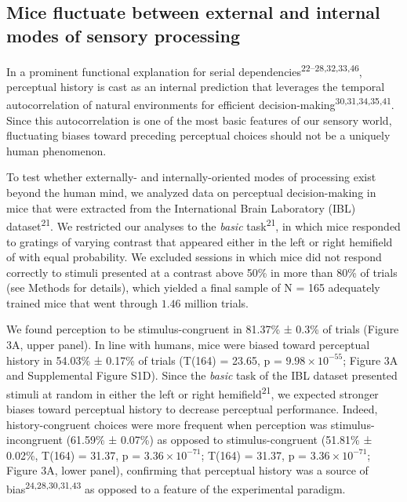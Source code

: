\documentclass[
]{article}
\begin{document}
\hypertarget{mice-fluctuate-between-external-and-internal-modes-of-sensory-processing}{%
\subsection{Mice fluctuate between external and internal modes of
sensory
processing}\label{mice-fluctuate-between-external-and-internal-modes-of-sensory-processing}}

In a prominent functional explanation for serial
dependencies\textsuperscript{22--28,32,33,46}, perceptual history is
cast as an internal prediction that leverages the temporal
autocorrelation of natural environments for efficient
decision-making\textsuperscript{30,31,34,35,41}. Since this
autocorrelation is one of the most basic features of our sensory world,
fluctuating biases toward preceding perceptual choices should not be a
uniquely human phenomenon.

To test whether externally- and internally-oriented modes of processing
exist beyond the human mind, we analyzed data on perceptual
decision-making in mice that were extracted from the International Brain
Laboratory (IBL) dataset\textsuperscript{21}. We restricted our analyses
to the \emph{basic} task\textsuperscript{21}, in which mice responded to
gratings of varying contrast that appeared either in the left or right
hemifield of with equal probability. We excluded sessions in which mice
did not respond correctly to stimuli presented at a contrast above 50\%
in more than 80\% of trials (see Methods for details), which yielded a
final sample of N = 165 adequately trained mice that went through
\(1.46\) million trials.

We found perception to be stimulus-congruent in 81.37\% ± 0.3\% of
trials (Figure 3A, upper panel). In line with humans, mice were biased
toward perceptual history in 54.03\% ± 0.17\% of trials (T(164) = 23.65,
p = \(\ensuremath{9.98\times 10^{-55}}\); Figure 3A and Supplemental
Figure S1D). Since the \emph{basic} task of the IBL dataset presented
stimuli at random in either the left or right
hemifield\textsuperscript{21}, we expected stronger biases toward
perceptual history to decrease perceptual performance. Indeed,
history-congruent choices were more frequent when perception was
stimulus-incongruent (61.59\% ± 0.07\%) as opposed to stimulus-congruent
(51.81\% ± 0.02\%, T(164) = 31.37, p =
\(\ensuremath{3.36\times 10^{-71}}\); T(164) = 31.37, p =
\(\ensuremath{3.36\times 10^{-71}}\); Figure 3A, lower panel),
confirming that perceptual history was a source of
bias\textsuperscript{24,28,30,31,43} as opposed to a feature of the
experimental paradigm.
\end{document}

